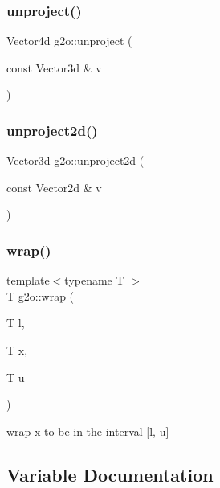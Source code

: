 \mbox{\label{namespaceg2o_a46785a7417bd703d67107c2b5f649007}} 
\subsubsection{\texorpdfstring{unproject()}{unproject()}\hspace{0.1cm}{\footnotesize\ttfamily [2/2]}}
{\footnotesize\ttfamily Vector4d g2o\+::unproject (\begin{DoxyParamCaption}\item[{const Vector3d \&}]{v }\end{DoxyParamCaption})\hspace{0.3cm}{\ttfamily [inline]}}

\mbox{\label{namespaceg2o_a6edbda6681de50df71048c5b72778998}} 
\subsubsection{\texorpdfstring{unproject2d()}{unproject2d()}}
{\footnotesize\ttfamily Vector3d g2o\+::unproject2d (\begin{DoxyParamCaption}\item[{const Vector2d \&}]{v }\end{DoxyParamCaption})}

\mbox{\label{namespaceg2o_a207912b4849eaff934f6384bc79d07ce}} 
\subsubsection{\texorpdfstring{wrap()}{wrap()}}
{\footnotesize\ttfamily template$<$typename T $>$ \\
T g2o\+::wrap (\begin{DoxyParamCaption}\item[{T}]{l,  }\item[{T}]{x,  }\item[{T}]{u }\end{DoxyParamCaption})\hspace{0.3cm}{\ttfamily [inline]}}

wrap x to be in the interval \mbox{[}l, u\mbox{]} 

\subsection{Variable Documentation}
\mbox{\label{namespaceg2o_a0dc4e6a4c5ab92d4c638aca75ad8219c}} 
